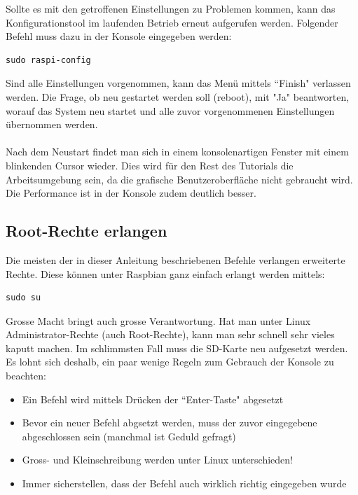 Sollte es mit den getroffenen Einstellungen zu Problemen kommen, kann das Konfigurationstool im laufenden Betrieb erneut aufgerufen werden. Folgender Befehl muss dazu in der Konsole eingegeben werden: 

\begin{lstlisting}
sudo raspi-config
\end{lstlisting} 

Sind alle Einstellungen vorgenommen, kann das Menü mittels ``Finish" verlassen werden. Die Frage, ob neu gestartet werden soll (reboot), mit "Ja" beantworten, worauf das System neu startet und alle zuvor vorgenommenen Einstellungen übernommen werden.
\\
\\
Nach dem Neustart findet man sich in einem konsolenartigen Fenster mit einem blinkenden Cursor wieder. Dies wird für den Rest des Tutorials die Arbeitsumgebung sein, da die grafische Benutzeroberfläche nicht gebraucht wird. Die Performance ist in der Konsole zudem deutlich besser.

\subsection{Root-Rechte erlangen}
Die meisten der in dieser Anleitung beschriebenen Befehle verlangen erweiterte Rechte. Diese können unter Raspbian ganz einfach erlangt werden mittels:

\begin{lstlisting}
sudo su
\end{lstlisting}

Grosse Macht bringt auch grosse Verantwortung. Hat man unter Linux Administrator-Rechte (auch Root-Rechte), kann man sehr schnell sehr vieles kaputt machen. Im schlimmsten Fall muss die SD-Karte neu aufgesetzt werden. Es lohnt sich deshalb, ein paar wenige Regeln zum Gebrauch der Konsole zu beachten: 

\begin{itemize}
\item Ein Befehl wird mittels Drücken der ``Enter-Taste" abgesetzt
\item Bevor ein neuer Befehl abgsetzt werden, muss der zuvor eingegebene abgeschlossen sein (manchmal ist Geduld gefragt)
\item Gross- und Kleinschreibung werden unter Linux unterschieden!
\item Immer sicherstellen, dass der Befehl auch wirklich richtig eingegeben wurde
\end{itemize}

